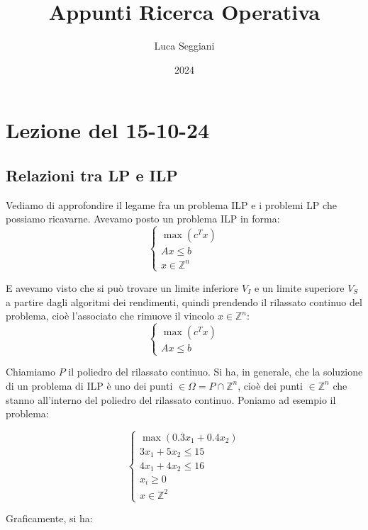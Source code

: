 \documentclass[a4paper,11pt]{article}
\title{Appunti Ricerca Operativa}
\author{Luca Seggiani}
\date{2024}
\begin{document}
\section{Lezione del 15-10-24}

\thispagestyle{empty}
\pagestyle{fancy}


\subsection{Relazioni tra LP e ILP}
Vediamo di approfondire il legame fra un problema ILP e i problemi LP che possiamo ricavarne.
Avevamo posto un problema ILP in forma:
\[
	\begin{cases}
			\max (c^T x) \\ 
			Ax \leq b \\ 
			x \in \mathbb{Z}^n
	\end{cases}
\]

E avevamo visto che si può trovare un limite inferiore $V_I$ e un limite superiore $V_S$ a partire dagli algoritmi dei rendimenti, quindi prendendo il rilassato continuo del problema, cioè l'associato che rimuove il vincolo $x \in \mathbb{Z}^n$:
\[
	\begin{cases}
			\max (c^T x) \\ 
			Ax \leq b
	\end{cases}
\]

Chiamiamo $P$ il poliedro del rilassato continuo.
Si ha, in generale, che la soluzione di un problema di ILP è uno dei punti $\in \Omega = P \cap \mathbb{Z}^n$, cioè dei punti $\in \mathbb{Z}^n$ che stanno all'interno del poliedro del rilassato continuo.
Poniamo ad esempio il problema:

\[
	\begin{cases}
		\max(0.3 x_1 + 0.4 x_2) \\
		3 x_1 + 5 x_2 \leq 15 \\ 
		4 x_1 +  4 x_2 \leq 16 \\ 
		x_i \geq 0 \\
		x \in \mathbb{Z}^2
	\end{cases}
\]

Graficamente, si ha:
\end{document}
